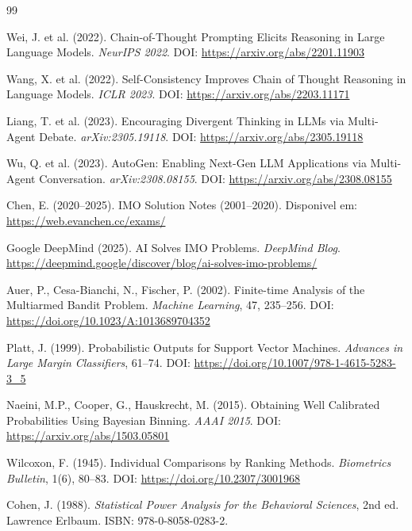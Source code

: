 \documentclass[5p]{elsarticle}
\begin{document}
\begin{thebibliography}{99}

 Wei, J. et al. (2022). Chain-of-Thought Prompting Elicits
  Reasoning in Large Language Models. \textit{NeurIPS 2022}.
  DOI: \url{https://arxiv.org/abs/2201.11903}

 Wang, X. et al. (2022). Self-Consistency Improves Chain of
  Thought Reasoning in Language Models. \textit{ICLR 2023}.
  DOI: \url{https://arxiv.org/abs/2203.11171}

 Liang, T. et al. (2023). Encouraging Divergent Thinking
  in LLMs via Multi-Agent Debate. \textit{arXiv:2305.19118}.
  DOI: \url{https://arxiv.org/abs/2305.19118}

 Wu, Q. et al. (2023). AutoGen: Enabling Next-Gen LLM
  Applications via Multi-Agent Conversation. \textit{arXiv:2308.08155}.
  DOI: \url{https://arxiv.org/abs/2308.08155}

 Chen, E. (2020--2025). IMO Solution Notes (2001--2020).
  Disponivel em: \url{https://web.evanchen.cc/exams/}

 Google DeepMind (2025). AI Solves IMO Problems.
  \textit{DeepMind Blog}. \url{https://deepmind.google/discover/blog/ai-solves-imo-problems/}

 Auer, P., Cesa-Bianchi, N., Fischer, P. (2002).
  Finite-time Analysis of the Multiarmed Bandit Problem.
  \textit{Machine Learning}, 47, 235--256.
  DOI: \url{https://doi.org/10.1023/A:1013689704352}

 Platt, J. (1999). Probabilistic Outputs for Support Vector
  Machines. \textit{Advances in Large Margin Classifiers}, 61--74.
  DOI: \url{https://doi.org/10.1007/978-1-4615-5283-3_5}

 Naeini, M.P., Cooper, G., Hauskrecht, M. (2015).
  Obtaining Well Calibrated Probabilities Using Bayesian Binning.
  \textit{AAAI 2015}. DOI: \url{https://arxiv.org/abs/1503.05801}

 Wilcoxon, F. (1945). Individual Comparisons by Ranking
  Methods. \textit{Biometrics Bulletin}, 1(6), 80--83.
  DOI: \url{https://doi.org/10.2307/3001968}

 Cohen, J. (1988). \textit{Statistical Power Analysis for the
  Behavioral Sciences}, 2nd ed. Lawrence Erlbaum.
  ISBN: 978-0-8058-0283-2.


\end{thebibliography}
\end{document}
